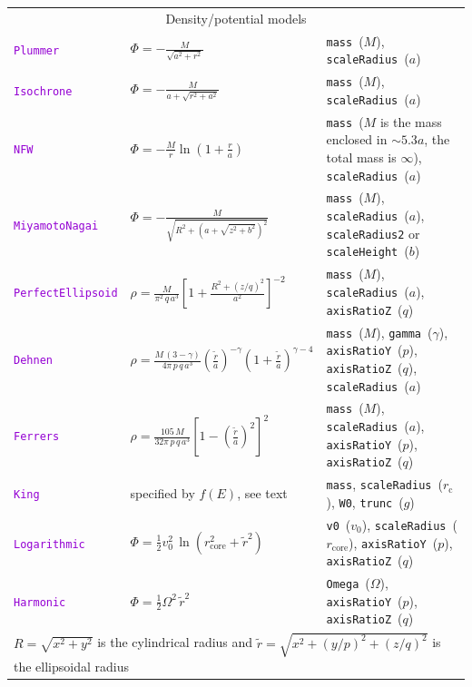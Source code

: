 \documentclass[12pt]{article}
\newcommand{\ttt}[1]{\textcolor{darkviolet}{\texttt{#1}}}
\newcommand{\ppp}[1]{\textcolor{darkolive} {\texttt{#1}}}
\begin{document}
\begin{table}
\begin{tabular}{l m{50mm} >{\raggedright\arraybackslash}m{80mm}}
\multicolumn{3}{c}{Density/potential models} \\

\ttt{Plummer} & $\Phi = -\frac{M}{\sqrt{a^2+r^2}}$ & \ppp{mass}~($M$), \ppp{scaleRadius}~($a$) \\[2mm]

\ttt{Isochrone} & $\Phi = - \frac{M}{a + \sqrt{r^2 + a^2}}$ & \ppp{mass}~($M$), \ppp{scaleRadius}~($a$) \\[2mm]

\ttt{NFW} & $\Phi = -\frac{M}{r} \ln\left(1 + \frac{r}{a}\right)$ & \ppp{mass}~($M$ {\footnotesize is the mass enclosed in $\sim5.3a$, the total mass is $\infty$}), \ppp{scaleRadius}~($a$) \\[2mm]

\ttt{MiyamotoNagai} & $\Phi = -\frac{M}{\sqrt{R^2 + \left(a + \sqrt{z^2+b^2}\right)^2}}$ & \ppp{mass}~($M$), \ppp{scaleRadius}~($a$), \ppp{scaleRadius2} or \ppp{scaleHeight}~($b$) \\[2mm]

\ttt{PerfectEllipsoid}\!\!\!\!\! & $\rho = \frac{M}{\pi^2\,q\,a^3} \left[ 1 + \frac{R^2+(z/q)^2}{a^2} \right]^{-2}$ &  \ppp{mass}~($M$), \ppp{scaleRadius}~($a$), \ppp{axisRatioZ}~($q$) \\[2mm]

\ttt{Dehnen} & $\rho = \frac{M\,(3-\gamma)}{4\pi\,p\,q\,a^3} \left(\frac{\tilde r}a\right)^{-\gamma} \left(1+\frac{\tilde r}a\right)^{\gamma-4}$\!\! &  \ppp{mass}~($M$), \ppp{gamma}~($\gamma$), \ppp{axisRatioY}~($p$), \ppp{axisRatioZ}~($q$), \ppp{scaleRadius}~($a$) \\[2mm]

\ttt{Ferrers} & $\rho = \frac{105\,M}{32\pi\,p\,q\,a^3} \left[1 - \left(\frac{\tilde r}a\right)^2\right]^2$ & \ppp{mass}~($M$), \ppp{scaleRadius}~($a$), \ppp{axisRatioY}~($p$), \ppp{axisRatioZ}~($q$) \\[2mm]

\ttt{King} & specified by $f(E)$, see text & 
\ppp{mass}, \ppp{scaleRadius}~($r_\mathrm{c}$), \ppp{W0}, \ppp{trunc}~($g$)
\\[1mm]

\ttt{Logarithmic} & $\Phi = \frac{1}{2} v_0^2\,\ln(r_\mathrm{core}^2 + \tilde r^2)$ & \ppp{v0}~($v_0$), \ppp{scaleRadius}~($r_\mathrm{core}$), \ppp{axisRatioY}~($p$), \ppp{axisRatioZ}~($q$) \\[2mm]

\ttt{Harmonic} & $\Phi = \frac{1}{2} \Omega^2\,\tilde r^2$ & \ppp{Omega}~($\Omega$), \ppp{axisRatioY}~($p$), \ppp{axisRatioZ}~($q$) \\[2mm]

\multicolumn{3}{l}{\footnotesize $R=\sqrt{x^2+y^2}$ is the cylindrical radius and $\tilde r=\sqrt{x^2+(y/p)^2+(z/q)^2}$ is the ellipsoidal radius}
\end{tabular}
\end{table}
\end{document}
